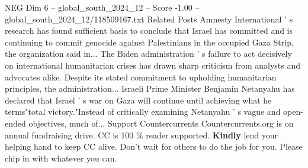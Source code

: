 \begin{textsample}{NEG Dim 6 – global\_south\_2024\_12 – Score -1.00 – global\_south\_2024\_12/118509167.txt}
Related Posts Amnesty International ' s research has found sufficient basis to conclude that Israel has committed and is continuing to commit genocide against Palestinians in the occupied Gaza Strip, the organization said in...
The Biden administration ' s failure to act decisively on international humanitarian crises has drawn sharp criticism from analysts and advocates alike.
Despite its stated commitment to upholding humanitarian principles, the administration...
Israeli Prime Minister Benjamin Netanyahu has declared that Israel ' s war on Gaza will continue until achieving what he terms"total victory."Instead of critically examining Netanyahu ' s vague and open-ended objectives, much of...
Support Countercurrents Countercurrents.org is on annual fundraising drive.
CC is 100 \% reader supported. \textbf{Kindly} lend your helping hand to keep CC alive.
Don't wait for others to do the job for you.
Please chip in with whatever you can.

\end{textsample}
